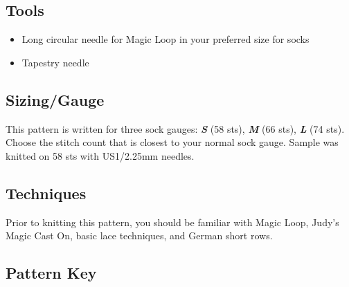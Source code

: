 \documentclass[12pt]{article}
\newcommand{\vocab}[1]{\emph{\textbf{#1}}} %
\begin{document}
\begin{titlingpage}
\begin{multicols}{2}

\subsection*{Tools}

\begin{itemize}
\item Long circular needle for Magic Loop in your preferred size for socks 
\item Tapestry needle 
\end{itemize}

\subsection*{Sizing/Gauge}


This pattern is written for three sock gauges: \vocab{S} (58 sts), \vocab{M} (66 sts), \vocab{L} (74 sts). Choose the stitch count that is closest to your normal sock gauge. Sample was knitted on 58 sts with US1/2.25mm needles.

\vfill
\columnbreak

\subsection*{Techniques}

Prior to knitting this pattern, you should be familiar with Magic Loop, Judy's Magic Cast On, basic lace techniques, and German short rows.



\subsection*{Pattern Key}

\vspace{-1em}
\small


\end{multicols}
\end{titlingpage}
\end{document}
